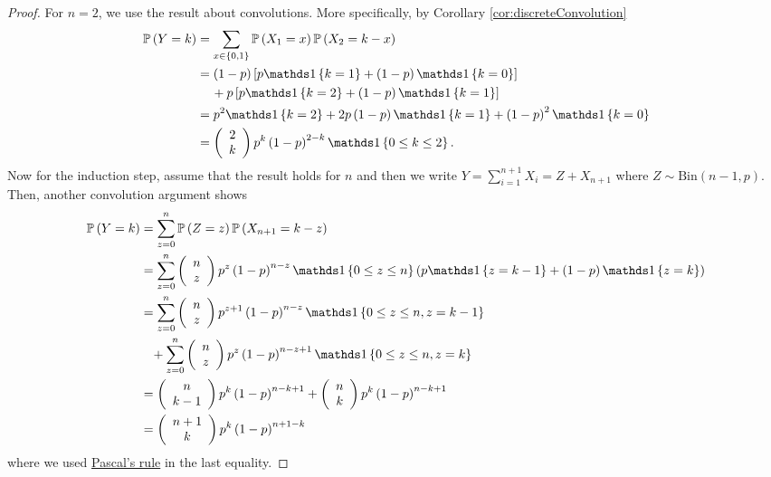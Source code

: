 \begin{proof}
For $n=2$, we use the result about convolutions. More specifically,
by Corollary \ref{cor:discreteConvolution}
\begin{align*}
\P\left(Y=k\right) & =\sum_{x\in\left\{ 0,1\right\} }\P\left(X_{1}=x\right)\P\left(X_{2}=k-x\right)\\
 & =\left(1-p\right)\left[p\indicate\left\{ k=1\right\} +\left(1-p\right)\indicate\left\{ k=0\right\} \right]\\
 & \ \ \ \!\ +p\left[p\indicate\left\{ k=2\right\} +\left(1-p\right)\indicate\left\{ k=1\right\} \right]\\
 & =p^{2}\indicate\left\{ k=2\right\} +2p\left(1-p\right)\indicate\left\{ k=1\right\} +\left(1-p\right)^{2}\indicate\left\{ k=0\right\} \\
 & =\left(\begin{array}{c}
2\\
k
\end{array}\right)p^{k}\left(1-p\right)^{2-k}\indicate\left\{ 0\leq k\leq2\right\} .
\end{align*}
Now for the induction step, assume that the result holds for $n$
and then we write $Y=\sum_{i=1}^{n+1}X_{i}=Z+X_{n+1}$ where $Z\sim\textrm{Bin}\left(n-1,p\right)$.
Then, another convolution argument shows
\begin{align*}
\P\left(Y=k\right) & =\sum_{z=0}^{n}\P\left(Z=z\right)\P\left(X_{n+1}=k-z\right)\\
 & =\sum_{z=0}^{n}\left(\begin{array}{c}
n\\
z
\end{array}\right)p^{z}\left(1-p\right)^{n-z}\indicate\left\{ 0\leq z\leq n\right\} \left(p\indicate\left\{ z=k-1\right\} +\left(1-p\right)\indicate\left\{ z=k\right\} \right)\\
 & =\sum_{z=0}^{n}\left(\begin{array}{c}
n\\
z
\end{array}\right)p^{z+1}\left(1-p\right)^{n-z}\indicate\left\{ 0\leq z\leq n,z=k-1\right\} \\
 & \ \ \!\ +\sum_{z=0}^{n}\left(\begin{array}{c}
n\\
z
\end{array}\right)p^{z}\left(1-p\right)^{n-z+1}\indicate\left\{ 0\leq z\leq n,z=k\right\} \\
 & =\left(\begin{array}{c}
n\\
k-1
\end{array}\right)p^{k}\left(1-p\right)^{n-k+1}+\left(\begin{array}{c}
n\\
k
\end{array}\right)p^{k}\left(1-p\right)^{n-k+1}\\
 & =\left(\begin{array}{c}
n+1\\
k
\end{array}\right)p^{k}\left(1-p\right)^{n+1-k}
\end{align*}
 where we used \hyperref[prop:pascalRule]{Pascal's rule} in the last
equality.
\end{proof}
